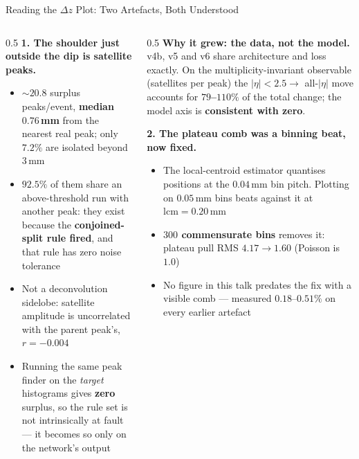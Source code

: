 \documentclass[xcolor=table,aspectratio=169]{beamer}
\begin{document}
\begin{frame}[shrink=15]{Reading the $\Delta z$ Plot: Two Artefacts, Both Understood}
    \begin{columns}[t]
        \begin{column}{0.5\linewidth}
            \small
            \textbf{1. The shoulder just outside the dip is satellite peaks.}
            \begin{itemize}\setlength\itemsep{0.2em}
                \item ${\sim}20.8$ surplus peaks/event, \textbf{median $0.76$\,mm} from
                    the nearest real peak; only $7.2\%$ are isolated beyond $3$\,mm
                \item \textbf{$92.5\%$} of them share an above-threshold run with
                    another peak: they exist because the \textbf{conjoined-split rule
                    fired}, and that rule has zero noise tolerance
                \item \textcolor{black!60}{Not a deconvolution sidelobe: satellite
                    amplitude is uncorrelated with the parent peak's,
                    $r = -0.004$}
                \item Running the same peak finder on the \emph{target} histograms
                    gives \textbf{zero} surplus, so the rule set is not intrinsically
                    at fault --- it becomes so only on the network's output
            \end{itemize}
        \end{column}
        \begin{column}{0.5\linewidth}
            \small
            \textbf{Why it grew: the data, not the model.}
            v4b, v5 and v6 share architecture and loss exactly. On the
            multiplicity-invariant observable (satellites per peak) the
            $|\eta|<2.5 \to$ all-$|\eta|$ move accounts for \textbf{$79$--$110\%$} of
            the total change; the model axis is \textbf{consistent with zero}.
            \vspace{0.5em}

            \textbf{2. The plateau comb was a binning beat, now fixed.}
            \begin{itemize}\setlength\itemsep{0.2em}
                \item The local-centroid estimator quantises positions at the
                    $0.04$\,mm bin pitch. Plotting on $0.05$\,mm bins beats against it
                    at $\mathrm{lcm}=0.20$\,mm
                \item \textbf{$300$ commensurate bins} removes it: plateau pull RMS
                    $4.17 \to 1.60$ (Poisson is $1.0$)
                \item \textcolor{black!60}{No figure in this talk predates the fix
                    with a visible comb --- measured $0.18$--$0.51\%$ on every
                    earlier artefact}
            \end{itemize}
        \end{column}
    \end{columns}
\end{frame}
\end{document}
